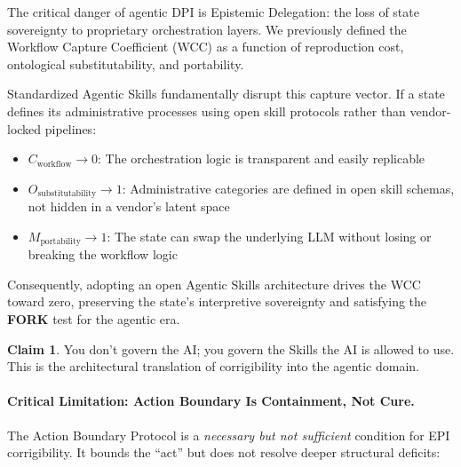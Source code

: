 \documentclass[11pt,a4paper]{article}
\theoremstyle{definition}
\newtheorem{claim}{Claim}[section]
\begin{document}
The critical danger of agentic DPI is Epistemic Delegation: the loss of state sovereignty to proprietary orchestration layers. We previously defined the Workflow Capture Coefficient (WCC) as a function of reproduction cost, ontological substitutability, and portability.

Standardized Agentic Skills fundamentally disrupt this capture vector. If a state defines its administrative processes using open skill protocols rather than vendor-locked pipelines:

\begin{itemize}[noitemsep]
    \item $C_{\text{workflow}} \to 0$: The orchestration logic is transparent and easily replicable
    \item $O_{\text{substitutability}} \to 1$: Administrative categories are defined in open skill schemas, not hidden in a vendor's latent space
    \item $M_{\text{portability}} \to 1$: The state can swap the underlying LLM without losing or breaking the workflow logic
\end{itemize}

Consequently, adopting an open Agentic Skills architecture drives the WCC toward zero, preserving the state's interpretive sovereignty and satisfying the \textbf{FORK} test for the agentic era.

\begin{claim}
You don't govern the AI; you govern the Skills the AI is allowed to use. This is the architectural translation of corrigibility into the agentic domain.
\end{claim}

\paragraph{Critical Limitation: Action Boundary Is Containment, Not Cure.} The Action Boundary Protocol is a \textit{necessary but not sufficient} condition for EPI corrigibility. It bounds the ``act'' but does not resolve deeper structural deficits:
\end{document}

